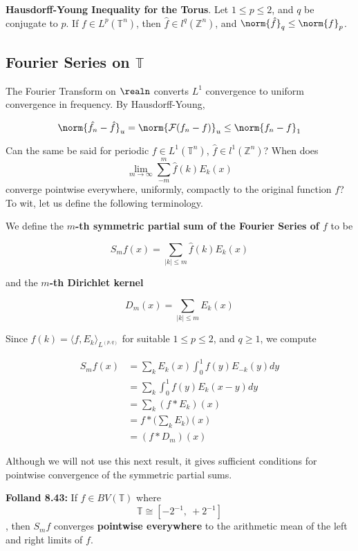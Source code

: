 \textbf{Hausdorff-Young Inequality for the Torus}. Let
\(1\leq p\leq 2\), and \(q\) be conjugate to \(p\). If
\(f\in L^p(\mathbb{T}^n)\), then \(\hat{f}\in l^q(\mathbb{Z}^n)\), and
\(\norm{\hat{f}}_q\leq\norm{f}_p\).

\hypertarget{fourier-series-on-mathbbt}{%
\subsection{\texorpdfstring{Fourier Series on
\(\mathbb{T}\)}{Fourier Series on \textbackslash mathbb\{T\}}}\label{fourier-series-on-mathbbt}}

The Fourier Transform on \(\realn\) converts \(L^1\) convergence to
uniform convergence in frequency. By Hausdorff-Young,

\[
\norm{\hat{f_n}-\hat{f}}_u=\norm{\mathcal{F}(f_n - f)}_u \leq\norm{f_n-f}_1
\]

Can the same be said for periodic \(f\in L^1(\mathbb{T}^n)\),
\(\hat{f}\in l^1(\mathbb{Z}^n)\)? When does
\[\lim_{m\to\infty}\sum_{-m}^{m} \hat{f}(k)E_{k}(x)\] converge pointwise
everywhere, uniformly, compactly to the original function \(f\)? To wit,
let us define the following terminology.

We define the \textbf{\(m\)-th symmetric partial sum of the Fourier
Series of \(f\)} to be

\[
S_mf(x) = \sum_{\vert k\vert\leq m} \hat{f}(k)E_{k}(x)
\]

and the \textbf{\(m\)-th Dirichlet kernel}

\[
D_m(x) = \sum_{\vert k\vert\leq m}E_k(x)
\]

Since \(\hat{f}(k) = \langle f, E_{k}\rangle_{L^{(p,q)}}\) for suitable
\(1\leq p\leq 2\), and \(q\geq 1\), we compute

\[
\begin{align}
S_m f(x) &= \sum_k E_{k}(x)\int_0^1 f(y)E_{-k}(y)dy \\
&= \sum_k \int_0^1 f(y)E_{k}(x-y)dy\\
&= \sum_k (f\ast E_{k})(x)\\
&= f\ast \biggl(\sum_k E_k\biggr)(x)\\
&= (f\ast D_m)(x)
\end{align}
\]

Although we will not use this next result, it gives sufficient
conditions for pointwise convergence of the symmetric partial sums.

\textbf{Folland 8.43:} If \(f\in BV(\mathbb{T})\) where
\[\mathbb{T}\cong [-2^{-1},\: +2^{-1}]\], then \(S_m f\) converges
\textbf{pointwise everywhere} to the arithmetic mean of the left and
right limits of \(f\).

